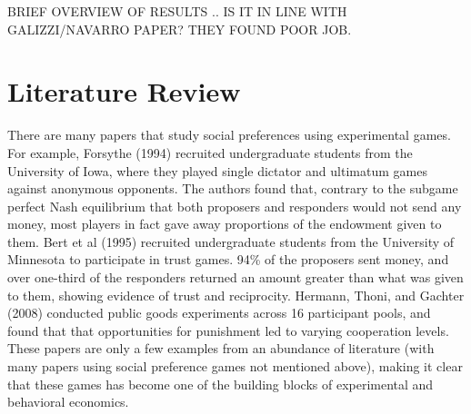 \documentclass[12pt]{article}
\begin{document}
 {\color{red} BRIEF OVERVIEW OF RESULTS .. IS IT IN LINE WITH GALIZZI/NAVARRO PAPER? THEY FOUND POOR JOB. }



\section{Literature Review}

There are many papers that study social preferences using experimental games. For example, Forsythe (1994) recruited undergraduate students from the University of Iowa, where they played single dictator and ultimatum games against anonymous opponents. The authors found that, contrary to the subgame perfect Nash equilibrium that both proposers and responders would not send any money, most players in fact gave away proportions of the endowment given to them. Bert et al (1995) recruited undergraduate students from the University of Minnesota to participate in trust games. 94\% of the proposers sent money, and over one-third of the responders returned an amount greater than what was given to them, showing evidence of trust and reciprocity. Hermann, Thoni, and Gachter (2008) conducted public goods experiments across 16 participant pools, and found that that opportunities for punishment led to varying cooperation levels. These papers are only a few examples from an abundance of literature (with many papers using social preference games not mentioned above), making it clear that these games has become one of the building blocks of experimental and behavioral economics. 
 
\end{document}
